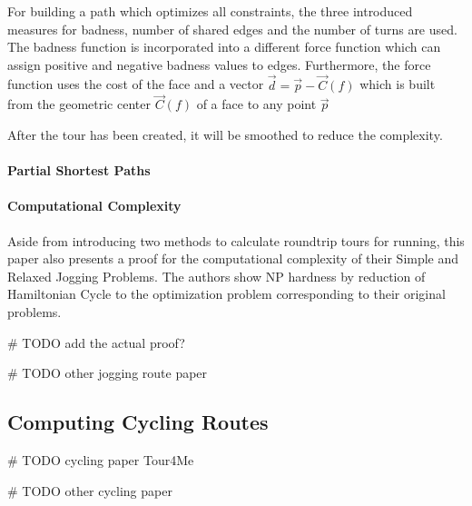 For building a path which optimizes all constraints, the three introduced measures for badness, number of shared edges and the number of turns are used.
The badness function is incorporated into a different force function which can assign positive and negative badness values to edges.
Furthermore, the force function uses the cost of the face and a vector $\vec{d} = \vec{p} - \vec{C}(f)$ which is built from the geometric center $\vec{C}(f)$ of a face to any point $\vec{p}$
 


After the tour has been created, it will be smoothed to reduce the complexity.


\paragraph{Partial Shortest Paths}





\paragraph{Computational Complexity}

Aside from introducing two methods to calculate roundtrip tours for running, this paper also presents a proof for the computational complexity of their Simple and Relaxed Jogging Problems.
The authors show NP hardness by reduction of Hamiltonian Cycle to the optimization problem corresponding to their original problems.

 \# TODO add the actual proof?

\# TODO other jogging route paper







\subsection{Computing Cycling Routes}
\label{subsec:cyclingRoutes}
\# TODO cycling paper Tour4Me

\# TODO other cycling paper









